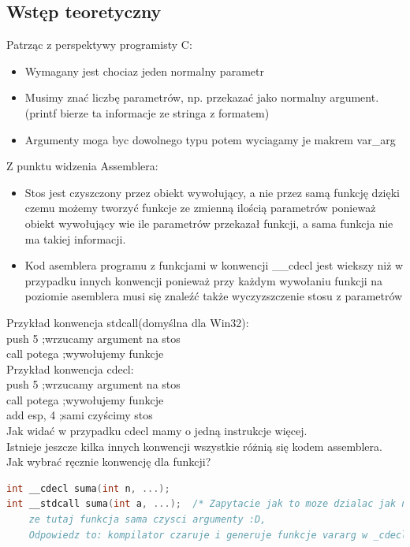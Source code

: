 \subsection{Wstęp teoretyczny}

Patrząc z perspektywy programisty C:
\begin{itemize}
\item Wymagany jest chociaz jeden normalny parametr
\item Musimy znać liczbę parametrów, np. przekazać jako normalny argument.(printf bierze ta informacje ze stringa z formatem)
\item Argumenty moga byc dowolnego typu potem wyciagamy je makrem var\_arg
\end{itemize}

Z punktu widzenia Assemblera:
\begin{itemize}
\item Stos jest czyszczony przez obiekt wywołujący, a nie przez samą funkcję dzięki czemu możemy tworzyć funkcje ze zmienną ilością parametrów ponieważ obiekt wywołujący wie ile parametrów przekazał funkcji, a sama funkcja nie ma takiej informacji.
\item Kod asemblera programu z funkcjami w konwencji \_\_cdecl jest wiekszy niż w przypadku innych konwencji ponieważ przy każdym wywołaniu funkcji na poziomie asemblera musi się znaleźć także wyczyzszczenie stosu z parametrów
\end{itemize}

Przykład konwencja stdcall(domyślna dla Win32):\\
push 5	;wrzucamy argument na stos\\
call potega	;wywołujemy funkcje\\

Przykład konwencja cdecl:\\
push 5	;wrzucamy argument na stos\\
call potega	;wywołujemy funkcje\\
add esp, 4	;sami czyścimy stos\\

Jak widać w przypadku cdecl mamy o jedną instrukcje więcej.\\

Istnieje jeszcze kilka innych konwencji wszystkie różnią się kodem assemblera.\\

Jak wybrać ręcznie konwencję dla funkcji?\\
\begin{lstlisting}[language=c]
int __cdecl suma(int n, ...);
int __stdcall suma(int a, ...);  /* Zapytacie jak to moze dzialac jak napisalem, 
	ze tutaj funkcja sama czysci argumenty :D, 
	Odpowiedz to: kompilator czaruje i generuje funkcje vararg w _cdecl */
\end{lstlisting}

